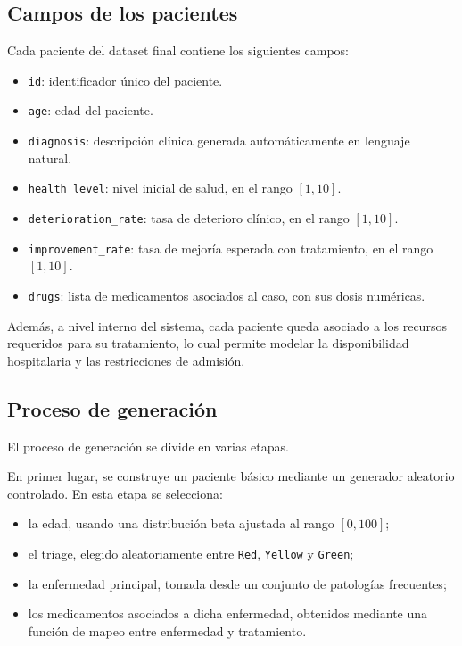 \documentclass[12pt,a4paper]{article}
\begin{document}
\subsection{Campos de los pacientes}

Cada paciente del dataset final contiene los siguientes campos:

\begin{itemize}
    \item \texttt{id}: identificador único del paciente.
    \item \texttt{age}: edad del paciente.
    \item \texttt{diagnosis}: descripción clínica generada automáticamente en lenguaje natural.
    \item \texttt{health\_level}: nivel inicial de salud, en el rango \([1,10]\).
    \item \texttt{deterioration\_rate}: tasa de deterioro clínico, en el rango \([1,10]\).
    \item \texttt{improvement\_rate}: tasa de mejoría esperada con tratamiento, en el rango \([1,10]\).
    \item \texttt{drugs}: lista de medicamentos asociados al caso, con sus dosis numéricas.
\end{itemize}

Además, a nivel interno del sistema, cada paciente queda asociado a los recursos requeridos para su tratamiento, 
lo cual permite modelar la disponibilidad hospitalaria y las restricciones de admisión.

\subsection{Proceso de generación}

El proceso de generación se divide en varias etapas.

En primer lugar, se construye un paciente básico mediante un generador aleatorio controlado. En esta etapa se selecciona:

\begin{itemize}
    \item la edad, usando una distribución beta ajustada al rango \([0,100]\);
    \item el triage, elegido aleatoriamente entre \texttt{Red}, \texttt{Yellow} y \texttt{Green};
    \item la enfermedad principal, tomada desde un conjunto de patologías frecuentes;
    \item los medicamentos asociados a dicha enfermedad, obtenidos mediante una función de mapeo entre enfermedad y tratamiento.
\end{itemize}
\end{document}
